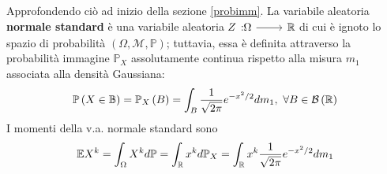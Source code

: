 \begin{examplewt}
	Approfondendo ciò ad inizio della sezione \ref{probimm}. La variabile aleatoria \textbf{normale standard} è una variabile aleatoria $\funz{Z}{\Omega}{\realset}$ di cui è ignoto lo spazio di probabilità $\left(\Omega,\mathcal{M},\mathbb{P}\right)$; tuttavia, essa è definita attraverso la probabilità immagine $\mathbb{P}_X$ assolutamente continua rispetto alla misura $m_1$ associata alla densità Gaussiana:
	\begin{equation}
		\mathbb{P}\left(X\in\mathbb{B}\right)=\mathbb{P}_X\left(B\right)=\int_B\frac{1}{\sqrt{2\pi}}e^{-x^2/2}dm_1,\ \forall B\in\mathcal{B}\left(\realset\right)
	\end{equation}
	I momenti della v.a. normale standard sono
	\begin{equation*}
		\mathbb{E}X^k=\int_{\Omega}X^kd\mathbb{P}=\int_{\mathbb{R}}x^kd\mathbb{P}_X=\int_{\mathbb{R}}x^k\frac{1}{\sqrt{2\pi}}e^{-x^2/2}dm_1
	\end{equation*}
\end{examplewt}
